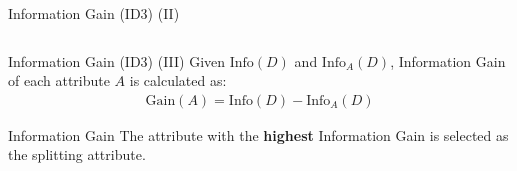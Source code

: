 \begin{frame}{Information Gain (ID3) (II)}
	\begin{columns}
	\end{columns}

\end{frame}

\begin{frame}{Information Gain (ID3) (III)}
	Given $\text{Info}(D)$ and $\text{Info}_A(D)$, Information Gain of each attribute $A$ is calculated as:
	\begin{align*}
		\text{Gain}(A) = \text{Info}(D) - \text{Info}_A(D)
	\end{align*}

	\vspace*{0.75cm}

	\begin{block}{Information Gain}
		The attribute with the \textbf{highest} Information Gain is selected as the splitting attribute.
	\end{block}
\end{frame}


